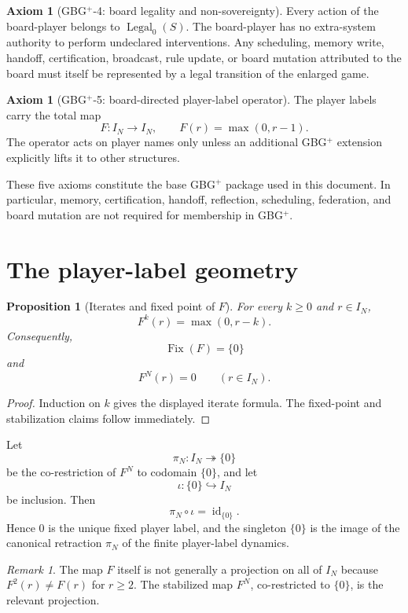 \documentclass[11pt]{article}
\newtheorem{proposition}[theorem]{Proposition}
\theoremstyle{definition}
\newtheorem{axiom}[theorem]{Axiom}
\theoremstyle{remark}
\newtheorem{remark}[theorem]{Remark}
\newcommand{\Legal}{\operatorname{Legal}}
\newcommand{\Fix}{\operatorname{Fix}}
\newcommand{\id}{\operatorname{id}}
\begin{document}
\begin{axiom}[GBG$^{+}$-4: board legality and non-sovereignty]
Every action of the board-player belongs to $\Legal_0(S)$.  The board-player has no extra-system authority to perform undeclared interventions.  Any scheduling, memory write, handoff, certification, broadcast, rule update, or board mutation attributed to the board must itself be represented by a legal transition of the enlarged game.
\end{axiom}

\begin{axiom}[GBG$^{+}$-5: board-directed player-label operator]
The player labels carry the total map
\[
F:I_N\to I_N,
\qquad
F(r)=\max(0,r-1).
\]
The operator acts on player names only unless an additional GBG$^{+}$ extension explicitly lifts it to other structures.
\end{axiom}

These five axioms constitute the base GBG$^{+}$ package used in this document.  In particular, memory, certification, handoff, reflection, scheduling, federation, and board mutation are not required for membership in GBG$^{+}$.

\section{The player-label geometry}

\begin{proposition}[Iterates and fixed point of $F$]
For every $k\ge0$ and $r\in I_N$,
\[
\boxed{F^k(r)=\max(0,r-k).}
\]
Consequently,
\[
\Fix(F)=\{0\}
\]
and
\[
F^N(r)=0
\qquad(r\in I_N).
\]
\end{proposition}

\begin{proof}
Induction on $k$ gives the displayed iterate formula.  The fixed-point and stabilization claims follow immediately.
\end{proof}

Let
\[
\pi_N:I_N\twoheadrightarrow\{0\}
\]
be the co-restriction of $F^N$ to codomain $\{0\}$, and let
\[
\iota:\{0\}\hookrightarrow I_N
\]
be inclusion.  Then
\[
\boxed{\pi_N\circ\iota=\id_{\{0\}}.}
\]
Hence $0$ is the unique fixed player label, and the singleton $\{0\}$ is the image of the canonical retraction $\pi_N$ of the finite player-label dynamics.

\begin{remark}
The map $F$ itself is not generally a projection on all of $I_N$ because $F^2(r)\neq F(r)$ for $r\ge2$.  The stabilized map $F^N$, co-restricted to $\{0\}$, is the relevant projection.
\end{remark}
\end{document}
